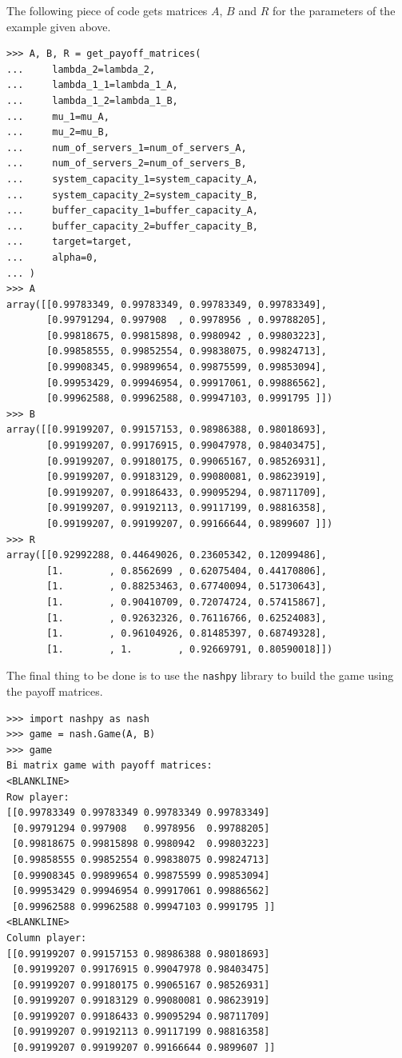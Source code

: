 The following piece of code gets matrices \(A\), \(B\) and \(R\) for the
parameters of the example given above.

\begin{lstlisting}[style=pystyle]
>>> A, B, R = get_payoff_matrices(
...     lambda_2=lambda_2,
...     lambda_1_1=lambda_1_A,
...     lambda_1_2=lambda_1_B,
...     mu_1=mu_A,
...     mu_2=mu_B,
...     num_of_servers_1=num_of_servers_A,
...     num_of_servers_2=num_of_servers_B,
...     system_capacity_1=system_capacity_A,
...     system_capacity_2=system_capacity_B,
...     buffer_capacity_1=buffer_capacity_A,
...     buffer_capacity_2=buffer_capacity_B,
...     target=target,
...     alpha=0,
... )
>>> A
array([[0.99783349, 0.99783349, 0.99783349, 0.99783349],
       [0.99791294, 0.997908  , 0.9978956 , 0.99788205],
       [0.99818675, 0.99815898, 0.9980942 , 0.99803223],
       [0.99858555, 0.99852554, 0.99838075, 0.99824713],
       [0.99908345, 0.99899654, 0.99875599, 0.99853094],
       [0.99953429, 0.99946954, 0.99917061, 0.99886562],
       [0.99962588, 0.99962588, 0.99947103, 0.9991795 ]])
>>> B
array([[0.99199207, 0.99157153, 0.98986388, 0.98018693],
       [0.99199207, 0.99176915, 0.99047978, 0.98403475],
       [0.99199207, 0.99180175, 0.99065167, 0.98526931],
       [0.99199207, 0.99183129, 0.99080081, 0.98623919],
       [0.99199207, 0.99186433, 0.99095294, 0.98711709],
       [0.99199207, 0.99192113, 0.99117199, 0.98816358],
       [0.99199207, 0.99199207, 0.99166644, 0.9899607 ]])
>>> R
array([[0.92992288, 0.44649026, 0.23605342, 0.12099486],
       [1.        , 0.8562699 , 0.62075404, 0.44170806],
       [1.        , 0.88253463, 0.67740094, 0.51730643],
       [1.        , 0.90410709, 0.72074724, 0.57415867],
       [1.        , 0.92632326, 0.76116766, 0.62524083],
       [1.        , 0.96104926, 0.81485397, 0.68749328],
       [1.        , 1.        , 0.92669791, 0.80590018]])

\end{lstlisting}

The final thing to be done is to use the \lstinline[style=pystyle]{nashpy}
library to build the game using the payoff matrices.

\begin{lstlisting}[style=pystyle]
>>> import nashpy as nash
>>> game = nash.Game(A, B)
>>> game
Bi matrix game with payoff matrices:
<BLANKLINE>
Row player:
[[0.99783349 0.99783349 0.99783349 0.99783349]
 [0.99791294 0.997908   0.9978956  0.99788205]
 [0.99818675 0.99815898 0.9980942  0.99803223]
 [0.99858555 0.99852554 0.99838075 0.99824713]
 [0.99908345 0.99899654 0.99875599 0.99853094]
 [0.99953429 0.99946954 0.99917061 0.99886562]
 [0.99962588 0.99962588 0.99947103 0.9991795 ]]
<BLANKLINE>
Column player:
[[0.99199207 0.99157153 0.98986388 0.98018693]
 [0.99199207 0.99176915 0.99047978 0.98403475]
 [0.99199207 0.99180175 0.99065167 0.98526931]
 [0.99199207 0.99183129 0.99080081 0.98623919]
 [0.99199207 0.99186433 0.99095294 0.98711709]
 [0.99199207 0.99192113 0.99117199 0.98816358]
 [0.99199207 0.99199207 0.99166644 0.9899607 ]]

\end{lstlisting}


